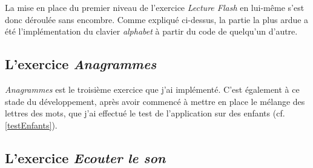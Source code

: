 La mise en place du premier niveau de l'exercice \textit{Lecture Flash} en lui-même s'est donc déroulée sans encombre. Comme expliqué ci-dessus, la partie la plus ardue a été l'implémentation du clavier \textit{alphabet} à partir du code de quelqu'un d'autre.
	
\subsection{L'exercice \textit{Anagrammes}}
\textit{Anagrammes} est le troisième exercice que j'ai implémenté. C'est également à ce stade du développement, après avoir commencé à mettre en place le mélange des lettres des mots, que j'ai effectué le test de l'application sur des enfants (cf. \ref{testEnfants}).

\subsection{L'exercice \textit{Ecouter le son}}
